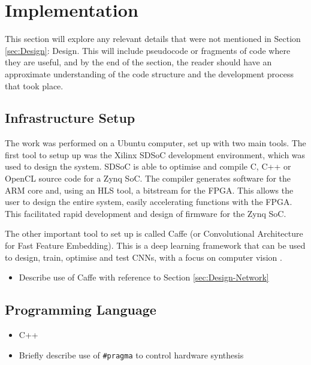 \documentclass[12pt]{article}
\begin{document}
\newpage

\section{Implementation}
\label{sec:Imp}


This section will explore any relevant details that were not mentioned in Section \ref{sec:Design}: Design. This will include pseudocode or fragments of code where they are useful, and by the end of the section, the reader should have an approximate understanding of the code structure and the development process that took place.

\subsection{Infrastructure Setup}
\label{sec:Imp-InfSetup}


The work was performed on a Ubuntu computer, set up with two main tools. The first tool to setup up was the Xilinx SDSoC development environment, which was used to design the system. SDSoC is able to optimise and compile C, C++ or OpenCL source code for a Zynq SoC. The compiler generates software for the ARM core and, using an HLS tool, a bitstream for the FPGA. This allows the user to design the entire system, easily accelerating functions with the FPGA. This facilitated rapid development and design of firmware for the Zynq SoC.

The other important tool to set up is called Caffe (or Convolutional Architecture for Fast Feature Embedding). This is a deep learning framework that can be used to design, train, optimise and test CNNs, with a focus on computer vision \cite{jia2014caffe}.
\begin{itemize}
\item Describe use of Caffe with reference to Section \ref{sec:Design-Network}
\end{itemize}

\subsection{Programming Language}
\label{sec:Imp-Language}


\begin{itemize}
\item C++
\item Briefly describe use of  \verb|#pragma| to control hardware synthesis
\end{itemize}
\end{document}
